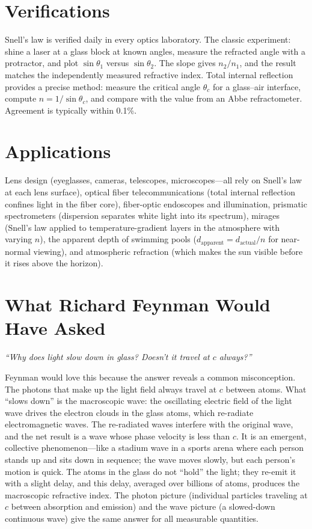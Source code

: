 \section*{Verifications}

Snell's law is verified daily in every optics laboratory. The classic experiment: shine a laser at a glass block at known angles, measure the refracted angle with a protractor, and plot $\sin\theta_1$ versus $\sin\theta_2$. The slope gives $n_2/n_1$, and the result matches the independently measured refractive index. Total internal reflection provides a precise method: measure the critical angle $\theta_c$ for a glass--air interface, compute $n = 1/\sin\theta_c$, and compare with the value from an Abbe refractometer. Agreement is typically within 0.1\%.
\section*{Applications}

Lens design (eyeglasses, cameras, telescopes, microscopes---all rely on Snell's law at each lens surface), optical fiber telecommunications (total internal reflection confines light in the fiber core), fiber-optic endoscopes and illumination, prismatic spectrometers (dispersion separates white light into its spectrum), mirages (Snell's law applied to temperature-gradient layers in the atmosphere with varying $n$), the apparent depth of swimming pools ($d_{\text{apparent}} = d_{\text{actual}}/n$ for near-normal viewing), and atmospheric refraction (which makes the sun visible before it rises above the horizon).
\section*{What Richard Feynman Would Have Asked}

\textit{``Why does light slow down in glass? Doesn't it travel at $c$ always?''}

Feynman would love this because the answer reveals a common misconception. The photons that make up the light field always travel at $c$ between atoms. What ``slows down'' is the macroscopic wave: the oscillating electric field of the light wave drives the electron clouds in the glass atoms, which re-radiate electromagnetic waves. The re-radiated waves interfere with the original wave, and the net result is a wave whose phase velocity is less than $c$. It is an emergent, collective phenomenon---like a stadium wave in a sports arena where each person stands up and sits down in sequence; the wave moves slowly, but each person's motion is quick. The atoms in the glass do not ``hold'' the light; they re-emit it with a slight delay, and this delay, averaged over billions of atoms, produces the macroscopic refractive index. The photon picture (individual particles traveling at $c$ between absorption and emission) and the wave picture (a slowed-down continuous wave) give the same answer for all measurable quantities.

